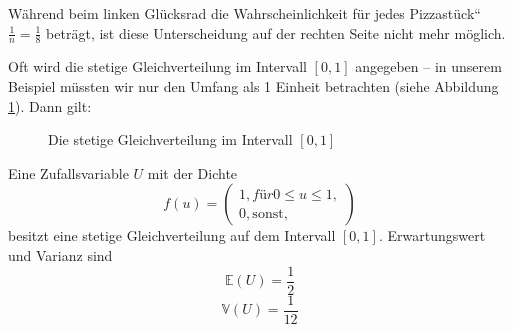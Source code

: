 {\begin{bsp}
\begin{center}
{
    }
    \end{center}

    Während beim linken Glücksrad die Wahrscheinlichkeit für jedes
    {\quotedblbase}Pizzastück{\textquotedblleft} 
    ${\frac{1}{n}=\frac{1}{8}}$
    beträgt, ist diese Unterscheidung
    auf der rechten Seite nicht mehr möglich. 
    \end{bsp}
    
    Oft wird die stetige
    Gleichverteilung im Intervall $[0,1]$ angegeben -- in unserem Beispiel
    müssten wir nur den Umfang als 1 Einheit betrachten (siehe Abbildung \ref{fig:gleichverteilung_stetig_0_1}). Dann gilt:

    {
        \begin{figure}
            \subfigure[Dichtefunktion]{
                \begin{tikzpicture}
                    
                \end{tikzpicture}
                \label{fig:gleichverteilung_stetig_0_1_a}
            }
            \subfigure[Verteilungsfunktion]{
                \begin{tikzpicture}
                    
                \end{tikzpicture}
                \label{fig:gleichverteilung_stetig_0_1_b}
            }
            \caption{Die stetige Gleichverteilung im Intervall $[0,1]$}
           \label{fig:gleichverteilung_stetig_0_1}
        \end{figure}
    }

    \begin{definition} 
    Eine Zufallsvariable $U$ mit der Dichte
    \[
    f\left(u\right)=\left(\begin{matrix}1,f\text{ü}r0\le
    u\le 1,\\0,\text{s}\text{o}\text{n}\text{s}\text{t}\text{,}\end{matrix}\right)
    \]
    besitzt eine stetige Gleichverteilung auf dem Intervall $[0,1]$.
    Erwartungswert und Varianz sind
    \[\mathbb E\left(U\right)=\frac{1}{2}\]
    \[\mathbb V\left(U\right)=\frac{1}{12}\]
    \end{definition}

}
